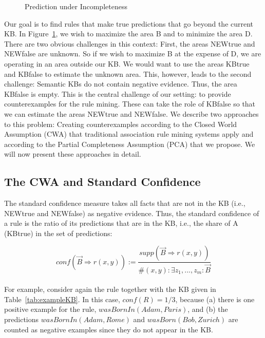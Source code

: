 \begin{figure}[h]
\caption{Prediction under Incompleteness}

\label{fig:prediction}
\end{figure}

Our goal is to find rules that make true predictions that go beyond the current KB.
In Figure~\ref{fig:prediction}, we wish to maximize the area B and to minimize the area D.
There are two obvious challenges in this context: First, the areas NEWtrue and NEWfalse are unknown.
So if we wish to maximize B at the expense of D, we are operating in an area outside our KB.
We would want to use the areas KBtrue and KBfalse to estimate the unknown area.
This, however, leads to the second challenge: Semantic KBs do not contain negative evidence.
Thus, the area KBfalse is empty.
This is the central challenge of our setting: to provide counterexamples for the rule mining.
These can take the role of KBfalse so that we can estimate the areas NEWtrue and NEWfalse.
We describe two approaches to this problem:
Creating counterexamples according to the Closed World Assumption (CWA) that traditional association rule mining systems apply and according to the Partial Completeness Assumption (PCA) that we propose.
We will now present these approaches in detail.



\subsection{The CWA and Standard Confidence} \label{subsubsec:stdConf}
The standard confidence measure takes all facts that are not in the KB (i.e., NEWtrue and NEWfalse) as negative evidence.
Thus, the standard confidence of a rule is the ratio of its predictions that are in the KB, i.e., the share of A (KBtrue)
in the set of predictions:

\[conf(\vec{B} \Rightarrow r(x,y)) := \frac{supp(\vec{B} \Rightarrow r(x,y))}{\#(x,y): \exists z_1,...,z_m: \vec{B}}\]\\

\noindent For example, consider again the rule
together with the KB given in Table~\ref{tab:exampleKB}. In this case, $conf(R)=1/3$, because (a) there is one positive example for the rule, $wasBornIn(Adam, Paris)$, and (b) the predictions $wasBornIn(Adam, Rome)$ and $wasBorn(Bob,Zurich)$ are counted as negative examples since they do not appear in the KB.

